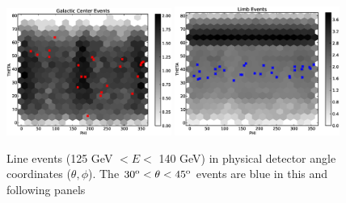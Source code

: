 \documentclass[aps,twocolumn,prd,superscriptaddress,showpacs,nofootinbib,fixfloat]{revtex4}
\newcommand{\degree}{^{\rm o}}
\begin{document}
\begin{figure}[p]
  \centering
  \includegraphics[width=0.48\textwidth]{plots/gc_theta_phi.eps}
  \includegraphics[width=0.48\textwidth]{plots/limb_theta_phi.eps}
  \caption{Line events (125 GeV $< E <$ 140 GeV) in physical detector angle
  coordinates ($\theta, \phi$).  The $30\degree < \theta < 45\degree$ events
  are blue in this and following panels}
  \label{fig:theta-phi}
\end{figure}
\end{document}
